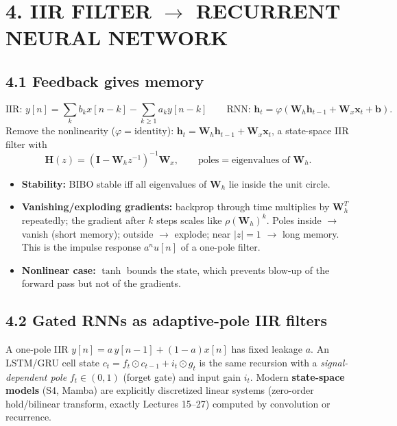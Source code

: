 \documentclass[11pt,a4paper]{article}
\begin{document}
\section{4. IIR FILTER $\to$ RECURRENT NEURAL NETWORK}

\subsection{4.1 Feedback gives memory}
\begin{equation}
\text{IIR: } y[n] = \sum_{k} b_k x[n-k] - \sum_{k\ge1} a_k y[n-k] \qquad
\text{RNN: } \mathbf{h}_t = \varphi(\mathbf{W}_h\mathbf{h}_{t-1} + \mathbf{W}_x\mathbf{x}_t + \mathbf{b}).
\end{equation}
Remove the nonlinearity ($\varphi=\text{identity}$): $\mathbf{h}_t = \mathbf{W}_h\mathbf{h}_{t-1} + \mathbf{W}_x\mathbf{x}_t$, a state-space IIR filter with
\begin{equation}
\mathbf{H}(z) = (\mathbf{I}-\mathbf{W}_h z^{-1})^{-1}\mathbf{W}_x, \qquad \text{poles} = \text{eigenvalues of } \mathbf{W}_h.
\end{equation}
\begin{itemize}
    \item \textbf{Stability:} BIBO stable iff all eigenvalues of $\mathbf{W}_h$ lie inside the unit circle.
    \item \textbf{Vanishing/exploding gradients:} backprop through time multiplies by $\mathbf{W}_h^T$ repeatedly; the gradient after $k$ steps scales like $\rho(\mathbf{W}_h)^k$. Poles inside $\to$ vanish (short memory); outside $\to$ explode; near $|z|=1$ $\to$ long memory. This is the impulse response $a^n u[n]$ of a one-pole filter.
    \item \textbf{Nonlinear case:} $\tanh$ bounds the state, which prevents blow-up of the forward pass but not of the gradients.
\end{itemize}

\subsection{4.2 Gated RNNs as adaptive-pole IIR filters}
A one-pole IIR $y[n] = a\,y[n-1] + (1-a)x[n]$ has fixed leakage $a$. An LSTM/GRU cell state $c_t = f_t\odot c_{t-1} + i_t\odot g_t$ is the same recursion with a \emph{signal-dependent pole} $f_t\in(0,1)$ (forget gate) and input gain $i_t$. Modern \textbf{state-space models} (S4, Mamba) are explicitly discretized linear systems (zero-order hold/bilinear transform, exactly Lectures 15--27) computed by convolution or recurrence.
\end{document}
